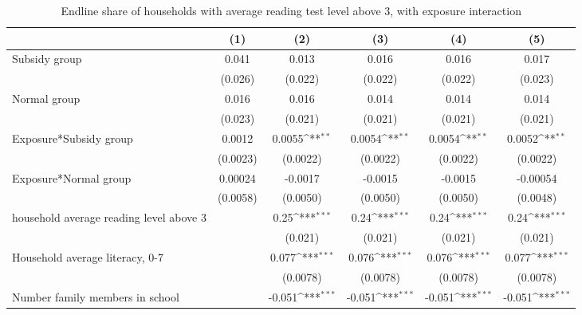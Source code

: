 \begin{table}[htbp]\centering
\def\sym#1{\ifmmode^{#1}\else\(^{#1}\)\fi}
\caption{Endline share of households with average reading test level above 3, with exposure interaction}
\begin{tabular*}{1\hsize}{@{\hskip\tabcolsep\extracolsep\fill}l*{5}{c}}
\toprule
                &\multicolumn{1}{c}{(1)}         &\multicolumn{1}{c}{(2)}         &\multicolumn{1}{c}{(3)}         &\multicolumn{1}{c}{(4)}         &\multicolumn{1}{c}{(5)}         \\
\midrule
Subsidy group   &    0.041         &    0.013         &    0.016         &    0.016         &    0.017         \\
                &  (0.026)         &  (0.022)         &  (0.022)         &  (0.022)         &  (0.023)         \\
Normal group    &    0.016         &    0.016         &    0.014         &    0.014         &    0.014         \\
                &  (0.023)         &  (0.021)         &  (0.021)         &  (0.021)         &  (0.021)         \\
Exposure*Subsidy group&   0.0012         &   0.0055\sym{**} &   0.0054\sym{**} &   0.0054\sym{**} &   0.0052\sym{**} \\
                & (0.0023)         & (0.0022)         & (0.0022)         & (0.0022)         & (0.0022)         \\
Exposure*Normal group&  0.00024         &  -0.0017         &  -0.0015         &  -0.0015         & -0.00054         \\
                & (0.0058)         & (0.0050)         & (0.0050)         & (0.0050)         & (0.0048)         \\
household average reading level above 3&                  &     0.25\sym{***}&     0.24\sym{***}&     0.24\sym{***}&     0.24\sym{***}\\
                &                  &  (0.021)         &  (0.021)         &  (0.021)         &  (0.021)         \\
Household average literacy, 0-7&                  &    0.077\sym{***}&    0.076\sym{***}&    0.076\sym{***}&    0.077\sym{***}\\
                &                  & (0.0078)         & (0.0078)         & (0.0078)         & (0.0078)         \\
Number family members in school&                  &   -0.051\sym{***}&   -0.051\sym{***}&   -0.051\sym{***}&   -0.051\sym{***}\\

\end{tabular*}
\end{table}
